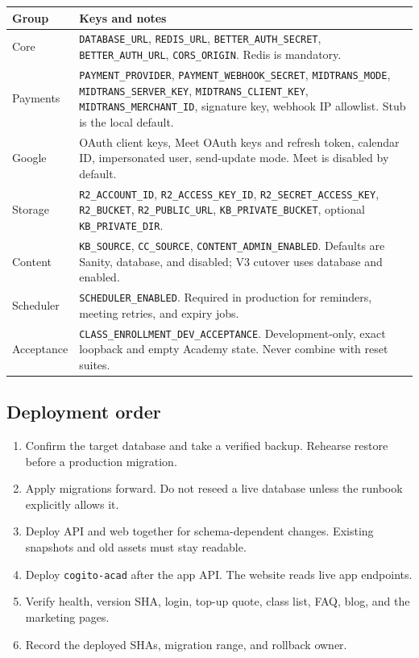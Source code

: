 \documentclass[11pt,a4paper]{article}
\newcommand{\code}[1]{\texttt{#1}}
\begin{document}
\begin{tabular}{@{}L{4.2cm}L{11.4cm}@{}}
\toprule
\textbf{Group} & \textbf{Keys and notes} \\
\midrule
Core & \code{DATABASE\_URL}, \code{REDIS\_URL}, \code{BETTER\_AUTH\_SECRET}, \code{BETTER\_AUTH\_URL}, \code{CORS\_ORIGIN}. Redis is mandatory. \\
Payments & \code{PAYMENT\_PROVIDER}, \code{PAYMENT\_WEBHOOK\_SECRET}, \code{MIDTRANS\_MODE}, \code{MIDTRANS\_SERVER\_KEY}, \code{MIDTRANS\_CLIENT\_KEY}, \code{MIDTRANS\_MERCHANT\_ID}, signature key, webhook IP allowlist. Stub is the local default. \\
Google & OAuth client keys, Meet OAuth keys and refresh token, calendar ID, impersonated user, send-update mode. Meet is disabled by default. \\
Storage & \code{R2\_ACCOUNT\_ID}, \code{R2\_ACCESS\_KEY\_ID}, \code{R2\_SECRET\_ACCESS\_KEY}, \code{R2\_BUCKET}, \code{R2\_PUBLIC\_URL}, \code{KB\_PRIVATE\_BUCKET}, optional \code{KB\_PRIVATE\_DIR}. \\
Content & \code{KB\_SOURCE}, \code{CC\_SOURCE}, \code{CONTENT\_ADMIN\_ENABLED}. Defaults are Sanity, database, and disabled; V3 cutover uses database and enabled. \\
Scheduler & \code{SCHEDULER\_ENABLED}. Required in production for reminders, meeting retries, and expiry jobs. \\
Acceptance & \code{CLASS\_ENROLLMENT\_DEV\_ACCEPTANCE}. Development-only, exact loopback and empty Academy state. Never combine with reset suites. \\
\bottomrule
\end{tabular}

\subsection{Deployment order}

\begin{enumerate}
	\item Confirm the target database and take a verified backup. Rehearse restore before a production migration.
	\item Apply migrations forward. Do not reseed a live database unless the runbook explicitly allows it.
	\item Deploy API and web together for schema-dependent changes. Existing snapshots and old assets must stay readable.
	\item Deploy \code{cogito-acad} after the app API. The website reads live app endpoints.
	\item Verify health, version SHA, login, top-up quote, class list, FAQ, blog, and the marketing pages.
	\item Record the deployed SHAs, migration range, and rollback owner.
\end{enumerate}
\end{document}
